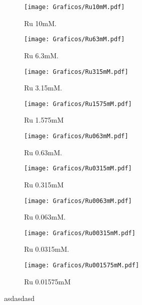 		    	\begin{figure}[th]
		   	     \begin{subfigure}[t]{0.325\textwidth}
		        	\texttt{[image: Graficos/Ru10mM.pdf]}
		        	\vspace*{-0.40cm}\caption{Ru 10mM.}
		         	\label{fig:Ventana_Ru1mM}
		     		\end{subfigure}
		   	    \begin{subfigure}[t]{0.325\textwidth}
		        	\texttt{[image: Graficos/Ru63mM.pdf]}
		       		\vspace*{-0.40cm}\caption{Ru 6.3mM.}
		         	\label{fig:Ventana_Ru63mM}
		     		\end{subfigure}
	     		\begin{subfigure}[t]{0.325\textwidth}
		        	\texttt{[image: Graficos/Ru315mM.pdf]}
		       		\vspace*{-0.40cm}\caption{Ru 3.15mM.}
		         	\label{fig:Ventana_Ru315mM}
		     		\end{subfigure}
	     		\begin{subfigure}[t]{0.325\textwidth}
		        	\texttt{[image: Graficos/Ru1575mM.pdf]}
		       		\vspace*{-0.40cm}\caption{Ru 1.575mM}
		         	\label{fig:Ru_0315mM}
		     		\end{subfigure}
	 	   	   	\begin{subfigure}[t]{0.325\textwidth}
		        	\texttt{[image: Graficos/Ru063mM.pdf]}
		       		\vspace*{-0.40cm}\caption{Ru 0.63mM.}
		         	\label{fig:Ventana_Ru1mM}
		     		\end{subfigure}
	     		\begin{subfigure}[t]{0.325\textwidth}
		        	\texttt{[image: Graficos/Ru0315mM.pdf]}
		       		\vspace*{-0.40cm}\caption{Ru 0.315mM}
		         	\label{fig:Ru_0mM}
		     		\end{subfigure}
		     	 \begin{subfigure}[t]{0.325\textwidth}
		        	\texttt{[image: Graficos/Ru0063mM.pdf]}
		       		\vspace*{-0.40cm}\caption{Ru 0.063mM.}
		         	\label{fig:Ventana_Ru0063mM}
		     		\end{subfigure}
	     		\begin{subfigure}[t]{0.325\textwidth}
		        	\texttt{[image: Graficos/Ru00315mM.pdf]}
		       		\vspace*{-0.40cm}\caption{Ru 0.0315mM.}
		         	\label{fig:Ventana_Ru00315mM}
		     		\end{subfigure}
	     		\begin{subfigure}[t]{0.325\textwidth}
		        	\texttt{[image: Graficos/Ru001575mM.pdf]}
		       		\vspace*{-0.40cm}\caption{Ru 0.01575mM}
		         	\label{fig:Ru_01575mM}
		     		\end{subfigure}	
	 	   	   	\caption[asdasdasd]{asdasdasd}
	     		\label{fig:ventana-trabajo}
	     	   	\end{figure} 	 	
